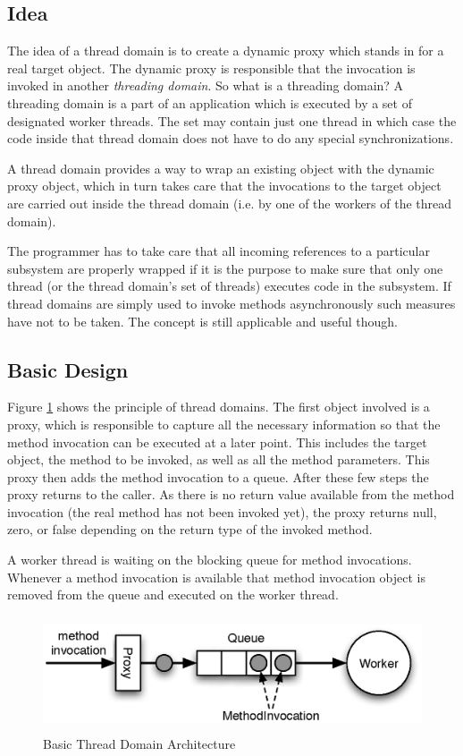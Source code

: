 \subsection{Idea}
The idea of a thread domain is to create a dynamic proxy which stands
in for a real target object. The dynamic proxy is responsible that the
invocation is invoked in another \emph{threading domain}. So what is
a threading domain? A threading domain is a part of an application
which is executed by a set of designated worker threads. The set may
contain just one thread in which case the code inside that thread domain
does not have to do any special synchronizations.

A thread domain provides a way to wrap an existing object with the dynamic
proxy object, which in turn takes care that the invocations to the
target object are carried out inside the thread domain (i.e. by one of
the workers of the thread domain).

The programmer has to take care that all incoming references
to a particular subsystem are properly wrapped if it is the purpose to
make sure that only one thread (or the thread domain's set of threads)
executes code in the subsystem. If thread domains are simply used to
invoke methods asynchronously such measures have not to be taken. The
concept is still applicable and useful though.


\subsection{Basic Design}
\label{sect:threaddomain.introduction.principle}
Figure \ref{fig:threaddomain_basic} shows the principle of thread domains.
The first object involved is a proxy, which is responsible to
capture all the necessary information so that the method invocation can
be executed at a later point. This includes the target object, the method
to be invoked, as well as all the method parameters. This proxy then adds
the method invocation to a queue. After these few steps the proxy returns
to the caller. As there is no return value available from the method 
invocation (the real method has not been invoked yet), the proxy returns
null, zero, or false depending on the return type of the
invoked method.

A worker thread is waiting on the blocking queue for method invocations.
Whenever a method invocation is available that method invocation object
is removed from the queue and executed on the worker thread. 

\begin{figure}[H]
 \centering
 \includegraphics[width=13cm,height=3.4cm]{../images/finalreport/threaddomain_basic.eps}
 \caption{Basic Thread Domain Architecture}
 \label{fig:threaddomain_basic}
\end{figure}



